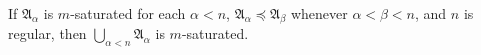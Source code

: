 If $\mathfrak{A}_\alpha$ is $m$-saturated for each $\alpha < n$, $\mathfrak{A}_\alpha \preceq \mathfrak{A}_\beta$ whenever $\alpha < \beta < n$, and $n$ is regular, then $\bigcup_{\alpha < n} \mathfrak{A}_\alpha$ is $m$-saturated.
